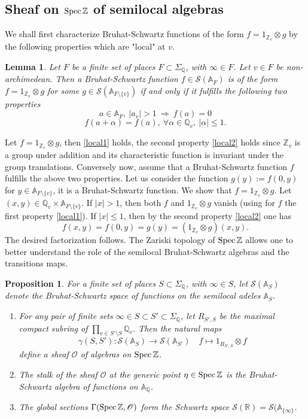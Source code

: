 \documentclass[letterpaper,11pt]{article}
\def\Spec{{\rm Spec\,}}
\def\A{{\mathbb A}}
\def\Q{{\mathbb Q}}
\def\R{\mathbb{R}}
\def\Z{\mathbb{Z}}
\def\cS{\mathcal{S}}
\def\sheaf{{\mathscr{O} }}
\theoremstyle{plain}
\newtheorem{prop}[thm]{Proposition}
\newtheorem{lem}[thm]{Lemma}
\begin{document}
\subsection{Sheaf on $\Spec\Z$ of semilocal algebras}\label{sheafsemiloc}
 		 We shall first characterize Bruhat-Schwartz functions of the form $f=1_{
         \Z_v}\otimes g$ by the following properties which are "local" at $v$.
\begin{lem}\label{localv} Let $F$ be a finite set of places $F\subset\Sigma_\Q$, with $\infty\in F$. Let $v\in F$ be non-archimedean. Then a Bruhat-Schwartz function $f\in \cS(\A_F)$ is of the form $f=1_{\Z_v}\otimes g$ for some $g\in \cS(\A_{F\setminus\{v\}})$ if and only if it fulfills the following two properties
\begin{equation}\label{local1}
  a\in \A_F, \ \vert a_v\vert >1~ \Rightarrow ~f(a)=0  
\end{equation}
\begin{equation}\label{local2}
  f(a+ \alpha)=f(a), \ \forall \alpha \in \Q_v, \ \vert \alpha \vert \leq 1.  
\end{equation}    
\end{lem}
\proof Let $f=1_{\Z_v}\otimes g$, then \eqref{local1} holds, 
the second property \eqref{local2} holds since $\Z_v$ is a group under addition and its characteristic function is invariant under the group translations.\newline 
Conversely now, assume that a Bruhat-Schwartz function $f$ fulfills the above two properties. Let us consider the function $g(y):=f(0,y)$ for $y\in \A_{F\setminus\{v\}}$, it is a Bruhat-Schwartz function.  We show that $f=1_{\Z_v}\otimes g$. Let $(x,y)\in \Q_v\times \A_{F\setminus\{v\}}$. If $\vert x\vert >1$, then both $f$ and $1_{
\Z_v}\otimes g$ vanish (using for $f$ the first property \eqref{local1}). If $\vert x\vert \leq 1$, then by the second property \eqref{local2} one has 
$$f(x,y)=f(0,y)=g(y)=(1_{\Z_v}\otimes g)(x,y).$$
 The desired factorization  follows. \endproof 
 		The Zariski topology of  $\Spec\Z$ allows one to better understand the role of the semilocal Bruhat-Schwartz algebras and the transitions maps.
 		\begin{prop}\label{structure} For a finite set of places $S\subset\Sigma_\Q$, with $\infty\in S$, let  $\cS(\A_S)$ denote the Bruhat-Schwartz space of functions on the semilocal adeles $\A_S$. 
 		\begin{enumerate}
 			\item  For any pair of finite sets $\infty\in S \subset S'\subset \Sigma_\Q$, let $R_{S',S}$ be the maximal compact subring of $\prod_{v\in S'\setminus S} \Q_v$. Then the  natural maps 
            $$\gamma(S,S'):\cS(\A_S)\to \cS(\A_{S'})\quad  f\mapsto 1_{R_{S',S}}\otimes f$$  
            define a sheaf $\sheaf$ of algebras on  $\Spec\Z$.
 			\item The stalk of the sheaf $\sheaf$ at the generic point $\eta\in \Spec\Z$ is the  Bruhat-Schwartz algebra of functions on $\A_\Q$.
 			\item The global sections $\Gamma(\Spec\Z,\sheaf)$ form the Schwartz space $\cS(\R)=\cS(\A_{\{\infty\}}$.
 		\end{enumerate}
\end{prop}
\end{document}
